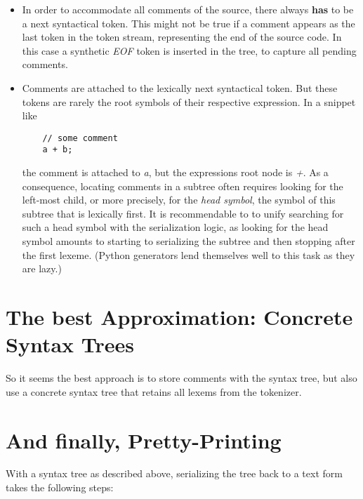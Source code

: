 \documentclass[11pt,a4paper]{article}
\begin{document}
\begin{itemize}
\item In order to accommodate all comments of the source, there always
  \textbf{has} to be a next syntactical token. This might not be true if a
  comment appears as the last token in the token stream, representing the end of
  the source code. In this case a synthetic \textit{EOF} token is inserted in
  the tree, to capture all pending comments.
\item Comments are attached to the lexically next syntactical token. But these
  tokens are rarely the root symbols of their respective expression. In a
  snippet like \\
  \begin{verbatim}
    // some comment
    a + b;
  \end{verbatim}
  the comment is attached to \emph{a}, but the expressions root node is
  \emph{+}. As a consequence, locating comments in a subtree often requires
  looking for the left-most child, or more precisely, for the \emph{head
  symbol}, the symbol of this subtree that is lexically first. It is
  recommendable to to unify searching for such a head symbol with the
  serialization logic, as looking for the head symbol amounts to starting to
  serializing the subtree and then stopping after the first lexeme. (Python
  generators lend themselves well to this task as they are lazy.)
\end{itemize}

\section{The best Approximation: Concrete Syntax Trees}

So it seems the best approach is to store comments with the syntax tree, but
also use a concrete syntax tree that retains all lexems from the tokenizer. 

\section{And finally, Pretty-Printing}

With a syntax tree as described above, serializing the tree back to a text form
takes the following steps:
\end{document}
